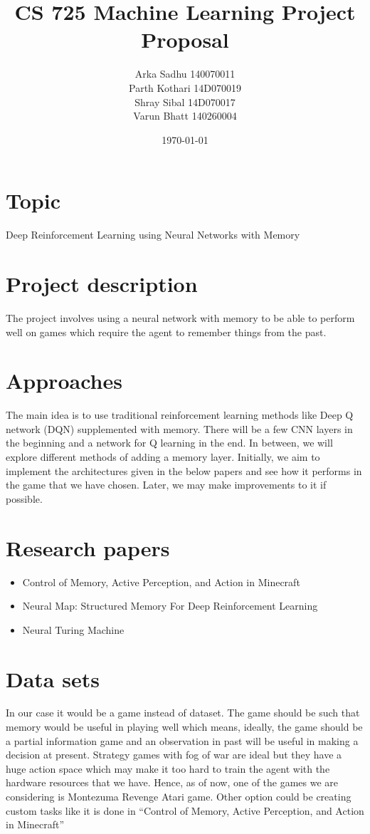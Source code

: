 \documentclass{article}
\title{CS 725 Machine Learning Project Proposal}
\author{
  Arka Sadhu 140070011\\
  Parth Kothari 14D070019\\
  Shray Sibal 14D070017\\
  Varun Bhatt 140260004\\}
\date{\today}
\begin{document}
\maketitle

\section{Topic}
Deep Reinforcement Learning using Neural Networks with Memory

\section{Project description}
The project involves using a neural network with memory to be able to perform well on games which require the agent to remember things from the past.

\section{Approaches}
The main idea is to use traditional reinforcement learning methods like Deep Q network (DQN) supplemented with memory. There will be a few CNN layers in the beginning and a network for Q learning in the end. In between, we will explore different methods of adding a memory layer. Initially, we aim to implement the architectures given in the below papers and see how it performs in the game that we have chosen. Later, we may make improvements to it if possible.

\section{Research papers}
\begin{itemize}
\item Control of Memory, Active Perception, and Action in Minecraft 
\item Neural Map: Structured Memory For Deep Reinforcement Learning 
\item Neural Turing Machine 
\end{itemize}


\section{Data sets}
In our case it would be a game instead of dataset. The game should be such that memory would be useful in playing well which means, ideally, the game should be a partial information game and an observation in past will be useful in making a decision at present. Strategy games with fog of war are ideal but they have a huge action space which may make it too hard to train the agent with the hardware resources that we have. Hence, as of now, one of the games we are considering is Montezuma Revenge Atari game. Other option could be creating custom tasks like it is done in “Control of Memory, Active Perception, and Action in Minecraft”
\end{document}
